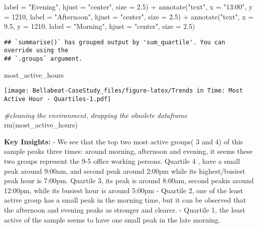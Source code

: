 \documentclass[
]{article}
\newenvironment{Shaded}{\begin{snugshade}}{\end{snugshade}}
\newcommand{\AttributeTok}[1]{\textcolor[rgb]{0.77,0.63,0.00}{#1}}
\newcommand{\CommentTok}[1]{\textcolor[rgb]{0.56,0.35,0.01}{\textit{#1}}}
\newcommand{\DecValTok}[1]{\textcolor[rgb]{0.00,0.00,0.81}{#1}}
\newcommand{\FloatTok}[1]{\textcolor[rgb]{0.00,0.00,0.81}{#1}}
\newcommand{\FunctionTok}[1]{\textcolor[rgb]{0.00,0.00,0.00}{#1}}
\newcommand{\NormalTok}[1]{#1}
\newcommand{\SpecialCharTok}[1]{\textcolor[rgb]{0.00,0.00,0.00}{#1}}
\newcommand{\StringTok}[1]{\textcolor[rgb]{0.31,0.60,0.02}{#1}}
\begin{document}
\begin{Shaded}
\begin{Highlighting}[]
            \AttributeTok{label =} \StringTok{"Evening"}\NormalTok{, }\AttributeTok{hjust =} \StringTok{"center"}\NormalTok{, }\AttributeTok{size =} \FloatTok{2.5}\NormalTok{) }\SpecialCharTok{+}
   \FunctionTok{annotate}\NormalTok{(}\StringTok{"text"}\NormalTok{, }\AttributeTok{x =} \StringTok{"13:00"}\NormalTok{, }\AttributeTok{y =} \DecValTok{1210}\NormalTok{, }
            \AttributeTok{label =} \StringTok{"Afternoon"}\NormalTok{, }\AttributeTok{hjust =} \StringTok{"center"}\NormalTok{, }\AttributeTok{size =} \FloatTok{2.5}\NormalTok{) }\SpecialCharTok{+}
   \FunctionTok{annotate}\NormalTok{(}\StringTok{"text"}\NormalTok{, }\AttributeTok{x =} \FloatTok{9.5}\NormalTok{, }\AttributeTok{y =} \DecValTok{1210}\NormalTok{, }
            \AttributeTok{label =} \StringTok{"Morning"}\NormalTok{, }\AttributeTok{hjust =} \StringTok{"center"}\NormalTok{, }\AttributeTok{size =} \FloatTok{2.5}\NormalTok{)}
\end{Highlighting}
\end{Shaded}

\begin{verbatim}
## `summarise()` has grouped output by 'sum_quartile'. You can override using the
## `.groups` argument.
\end{verbatim}

\begin{Shaded}
\begin{Highlighting}[]
\NormalTok{ most\_active\_hours}
\end{Highlighting}
\end{Shaded}

\texttt{[image: Bellabeat-CaseStudy\_files/figure-latex/Trends in Time: Most Active Hour - Quartiles-1.pdf]}

\begin{Shaded}
\begin{Highlighting}[]
 \CommentTok{\#cleaning the environment, dropping the obsolete dataframe}
   \FunctionTok{rm}\NormalTok{(most\_active\_hours)}
\end{Highlighting}
\end{Shaded}

\textbf{Key Insights:} - We see that the top two most active groups( 3
and 4) of this sample peaks three times: around morning, afternoon and
evening, it seems these two groups represent the 9-5 office working
persons. Quartile 4 , have a small peak around 9:00am, and second peak
around 2:00pm while its highest/busiest peak hour is 7:00pm. Quartile 3,
its peak is around 8:00am, second peakis around 12:00pm, while its
busiest hour is around 5:00pm - Quartile 2, one of the least active
group has a small peak in the morning time, but it can be observed that
the afternoon and evening peaks as stronger and clearer. - Quartile 1,
the least active of the sample seems to have one small peak in the late
morning.\\
\strut \\
\strut \\
\end{document}
